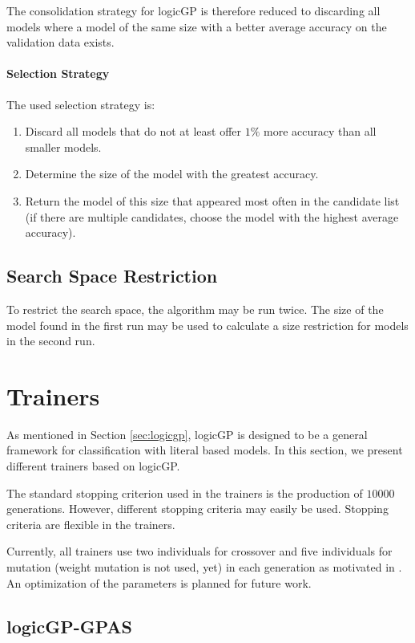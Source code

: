 \documentclass[dvipsnames,format=sigconf,anonymous=false,review=false]{acmart}
\begin{document}
 The consolidation strategy for logicGP is therefore reduced to discarding all models where a model of the same size with a better average accuracy on the validation data exists.

\paragraph{Selection Strategy} The used selection strategy is:

\begin{enumerate}
  \item Discard all models that do not at least offer $1\%$ more accuracy than all smaller models.
  \item Determine the size of the model with the greatest accuracy.
  \item Return the model of this size that appeared most often in the candidate list (if there are multiple candidates, choose the model with the highest average accuracy).
\end{enumerate}

\subsection{Search Space Restriction}

To restrict the search space, the algorithm may be run twice. The size of the model found in the first run may be used to calculate a size restriction for models in the second run.

\section{Trainers}\label{sec:trainers}

As mentioned in Section \ref{sec:logicgp}, logicGP is designed to be a general framework for classification with literal based models. In this section, we present different trainers based on logicGP.

The standard stopping criterion used in the trainers is the production of $10000$ generations. However, different stopping criteria may easily be used. Stopping criteria are flexible in the trainers.  

Currently, all trainers use two individuals for crossover and five individuals for mutation (weight mutation is not used, yet) in each generation as motivated in \citet{Nunkesser2008b}. An optimization of the parameters is planned for future work.

\subsection{logicGP-GPAS}
\end{document}
